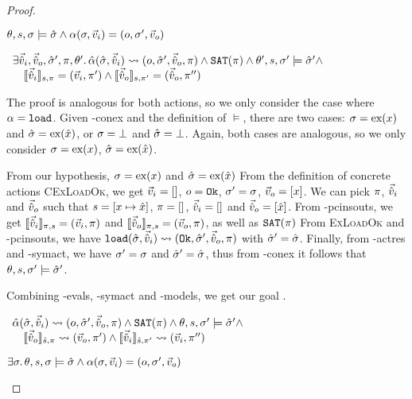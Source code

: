 \begin{proof}


\pfassume \begin{hypvlist}
 $\theta,s,\st\models\sst \land \ppexecc{\alpha}{\st,\ins}{o,\st',\outs}$
\end{hypvlist}
\pfprove \begin{goalvlist}
 $
\begin{array}{l}
\exists \sins,\souts,\sst',\pc,\theta'\ldotp \ppexec{\hat\alpha}{\sst,\sins}{o,\sst',\souts,\pc} \land \SAT(\pc) \land \theta',s,\st'\models \sst' \land\\
\quad \expeval[s,\pc]{\sins}=(\ins,\pc')\land\expeval[s,\pc']{\souts}=(\souts,\pc'')
\end{array}
$
\end{goalvlist}

The proof is analogous for both actions, so we only consider the case where $\alpha=\load$. Given \hyp{conex} and the definition of $\models$, there are two cases: $\st=\ex{x}$ and $\sst=\ex{\sym x}$, or $\st=\bot$ and $\sst=\bot$. Again, both cases are analogous, so we only consider $\st=\ex{x}$, $\sst=\ex{\sym x}$.

\begin{hypvlist}
 From our hypothesis, $\st=\ex{x}$ and $\sst=\ex{\sym x}$
 From the definition of concrete actions \textsc{CExLoadOk}, we get $\ins=[]$, $o=\Ok$, $\st'=\st$, $\outs=[x]$.
 We can pick $\pc$, $\sins$ and $\souts$ such that $s=[x\mapsto \sym x]$, $\pc = []$, $\sins=[]$ and $\souts=[\sym x]$.
 From \hyp{pcinsouts}, we get $\expeval[\pc,s]{\sins}=(\ins,\pc)$ and $\expeval[\pc,s]{\souts}=(\outs,\pc)$, as well as $\SAT(\pc)$
 From \textsc{ExLoadOk} and \hyp{pcinsouts}, we have $\ppexec{\load}{\sst,\sins}{\Ok, \sst', \souts, \pc}$ with $\sst'=\sst$.
 Finally, from \hyp{actres} and \hyp{symact}, we have $\st'=\st$ and $\sst'=\sst$, thus from \hyp{conex} it follows that $\theta,s,\st'\models\sst'$.
\end{hypvlist}
Combining \hyp{evals}, \hyp{symact} and \hyp{models}, we get our goal .


\pfassume \begin{hypvlist}
 $
\begin{array}{l}
\ppexec{\hat\alpha}{\sst,\sins}{o,\sst',\souts, \pc} \land \SAT(\pc) \land \theta,s,\st'\models\sst' \land \\
\quad \expeval[\hat s,\pc]{\souts}\rightsquigarrow(\outs,\pc')\land \expeval[\hat s,\pc']{\sins}\rightsquigarrow(\ins,\pc'')
\end{array}
$
\end{hypvlist}
\pfprove \begin{goalvlist}
 $\exists \st\ldotp \theta,s,\st\models\sst \land \ppexecc{\alpha}{\st,\ins}{o,\st',\outs}$
\end{goalvlist}


\end{proof}
